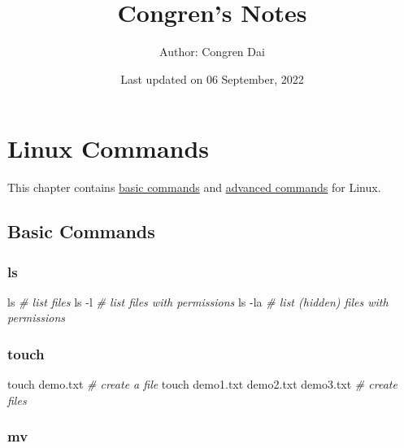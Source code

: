 \documentclass[
]{book}
\title{Congren's Notes}
\author{Author: Congren Dai}
\date{Last updated on 06 September, 2022}
\newenvironment{Shaded}{\begin{snugshade}}{\end{snugshade}}
\newcommand{\AttributeTok}[1]{\textcolor[rgb]{0.77,0.63,0.00}{#1}}
\newcommand{\CommentTok}[1]{\textcolor[rgb]{0.56,0.35,0.01}{\textit{#1}}}
\newcommand{\FunctionTok}[1]{\textcolor[rgb]{0.00,0.00,0.00}{#1}}
\newcommand{\NormalTok}[1]{#1}
\begin{document}
\maketitle

{
\setcounter{tocdepth}{1}
\tableofcontents
}
\hypertarget{linux-commands}{%
\chapter{Linux Commands}\label{linux-commands}}

This chapter contains \protect\hyperlink{basic}{basic commands} and \protect\hyperlink{advanced}{advanced commands} for Linux.

\hypertarget{basic}{%
\section{Basic Commands}\label{basic}}

\hypertarget{ls}{%
\subsection*{ls}\label{ls}}

\begin{Shaded}
\begin{Highlighting}[]
\FunctionTok{ls} \CommentTok{\# list files}
\FunctionTok{ls} \AttributeTok{{-}l} \CommentTok{\# list files with permissions}
\FunctionTok{ls} \AttributeTok{{-}la} \CommentTok{\# list (hidden) files with permissions}
\end{Highlighting}
\end{Shaded}

\hypertarget{touch}{%
\subsection*{touch}\label{touch}}

\begin{Shaded}
\begin{Highlighting}[]
\FunctionTok{touch}\NormalTok{ demo.txt }\CommentTok{\# create a file}
\FunctionTok{touch}\NormalTok{ demo1.txt demo2.txt demo3.txt }\CommentTok{\# create files}
\end{Highlighting}
\end{Shaded}

\hypertarget{mv}{%
\subsection*{mv}\label{mv}}
\end{document}
